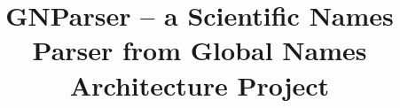 \documentclass{bmcart}
\begin{document}
\begin{frontmatter}

\begin{fmbox}


\title{GNParser -- a Scientific Names Parser
  from Global Names Architecture Project}


\author[
   addressref={aff1},
   corref={aff1},                       %
   email={dmozzherin@gmail.com}
]{ }
\author[                  %
   noteref={n1},%
   email={alexander.myltsev@phystech.edu}   %
]{ }
\author[
   email={dpatterson.mbl@gmail.com}
]{ }


\address[id=aff1]{%
  ,    %
  ,                     %
  ,                         %
}


\end{fmbox}
\end{frontmatter}
\end{document}
